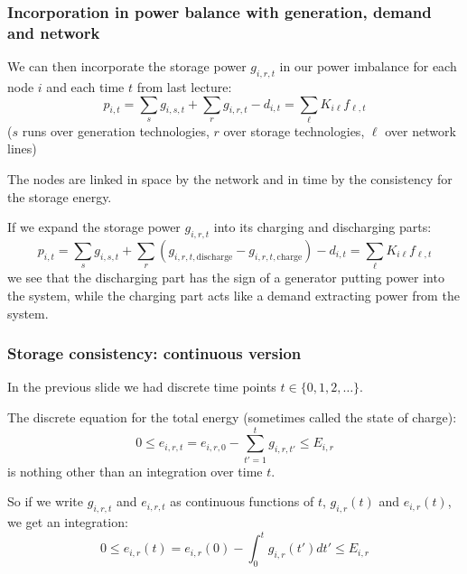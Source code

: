 \documentclass[10pt,aspectratio=169,dvipsnames]{beamer}
\begin{document}
\begin{frame}
  \frametitle{Incorporation in power balance with generation, demand and network}

  We can then incorporate the storage power $g_{i,r,t}$ in our power imbalance for each node $i$ and each time $t$ from last lecture:
  \begin{equation*}
    p_{i,t} = \sum_{s} g_{i,s,t} + \sum_{r} g_{i,r,t} - d_{i,t} = \sum_{\ell} K_{i\ell} f_{\ell,t}
  \end{equation*}
  ($s$ runs over generation technologies, $r$ over storage technologies, $\ell$ over network lines)

  The nodes are linked in space by the network and in time by the consistency for the storage energy.

  If we expand the storage power $g_{i,r,t}$ into its charging and discharging parts:
  \begin{equation*}
    p_{i,t} = \sum_{s} g_{i,s,t} + \sum_{r}\left(g_{i,r,t,\textrm{discharge}}  - g_{i,r,t,\textrm{charge}}\right) - d_{i,t} = \sum_{\ell} K_{i\ell} f_{\ell,t}
  \end{equation*}
  we see that the discharging part has the sign of a generator putting power into the system, while the charging part acts like a demand extracting power from the system.

\end{frame}
\begin{frame}
  \frametitle{Storage consistency: continuous version}

  In the previous slide we had discrete time points $t\in\{0,1,2,\dots\}$.

  The discrete equation for the total energy (sometimes called the \alert{state of charge}):
    \begin{equation*}
    0 \leq e_{i,r,t} = e_{i,r,0} -\sum_{t'=1}^{t} g_{i,r,t'} \leq E_{i,r}
  \end{equation*}
    is nothing other than an integration over time $t$.

    So if we write $g_{i,r,t}$ and $e_{i,r,t}$ as continuous functions of $t$, $g_{i,r}(t)$ and $e_{i,r}(t)$, we get an integration:
    \begin{equation*}
       0 \leq e_{i,r}(t) = e_{i,r}(0) - \int_0^t g_{i,r}(t') dt'  \leq E_{i,r}
    \end{equation*}

\end{frame}
\end{document}

